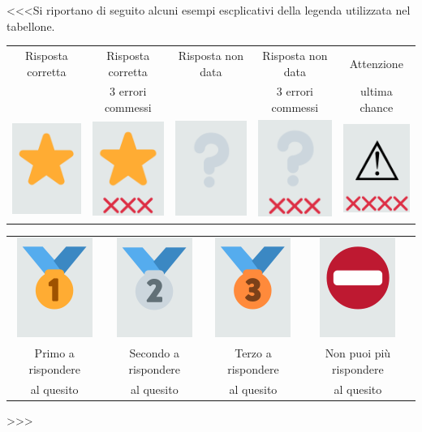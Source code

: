 \documentclass[12pt]{mcquiz}
\def\-#1{\qst <<<#1>>>}
\begin{document}
\-{Si riportano di seguito alcuni esempi escplicativi della legenda utilizzata nel tabellone.
\setlength{\tabcolsep}{10pt}
\begin{center}
\begin{tabular}{ccccc}
Risposta corretta & Risposta corretta & Risposta non data & Risposta non data & Attenzione\\
& 3 errori commessi & &3 errori commessi & ultima chance\\
\includegraphics[width=.08\textwidth]{Stella.png}&
\includegraphics[width=.08\textwidth]{Stella3.png}&
\includegraphics[width=.08\textwidth]{PuntoInt.png}&\includegraphics[width=.08\textwidth]{PuntoInt3.png}&\includegraphics[width=.08\textwidth]{Attenzione.png}
\end{tabular}
\end{center}
\begin{center}
\begin{tabular}{cccc}
\includegraphics[width=.08\textwidth]{Primo.png}&
\includegraphics[width=.08\textwidth]{Secondo.png}&
\includegraphics[width=.08\textwidth]{Terzo.png}&\includegraphics[width=.08\textwidth]{Divieto.png}\\
Primo a rispondere & Secondo a rispondere & Terzo a rispondere & Non puoi più rispondere \\
al quesito & al quesito & al quesito & al quesito \\
\end{tabular}
\end{center}}
\end{document}
